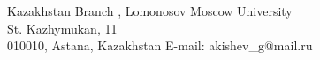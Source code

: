 \documentclass[12pt]{article}
\theoremstyle{plain}
\begin{document}
\begin{flushleft}
Kazakhstan Branch , Lomonosov Moscow University\\
St. Kazhymukan, 11 \\
010010, Astana, Kazakhstan 
 E-mail: akishev\_g@mail.ru
\end{flushleft}
\end{document}
